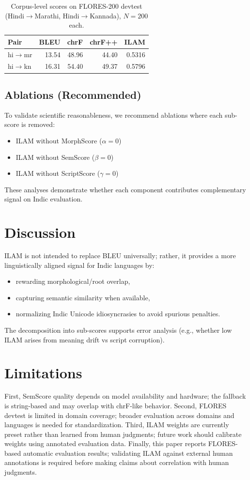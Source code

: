 \documentclass[conference]{IEEEtran}
\begin{document}
\begin{table}[t]
\centering
\caption{Corpus-level scores on FLORES-200 devtest (Hindi$\rightarrow$Marathi, Hindi$\rightarrow$Kannada), $N=200$ each.}
\label{tab:baselines}
\begin{tabular}{lrrrr}
\toprule
Pair & BLEU & chrF & chrF++ & ILAM \\
\midrule
hi$\rightarrow$mr & 13.54 & 48.96 & 44.40 & 0.5316 \\
hi$\rightarrow$kn & 16.31 & 54.40 & 49.37 & 0.5796 \\
\bottomrule
\end{tabular}
\end{table}

\subsection{Ablations (Recommended)}
To validate scientific reasonableness, we recommend ablations where each sub-score is removed:
\begin{itemize}
  \item ILAM without MorphScore ($\alpha=0$)
  \item ILAM without SemScore ($\beta=0$)
  \item ILAM without ScriptScore ($\gamma=0$)
\end{itemize}
These analyses demonstrate whether each component contributes complementary signal on Indic evaluation.

\section{Discussion}
ILAM is not intended to replace BLEU universally; rather, it provides a more linguistically aligned signal for Indic languages by:
\begin{itemize}
  \item rewarding morphological/root overlap,
  \item capturing semantic similarity when available,
  \item normalizing Indic Unicode idiosyncrasies to avoid spurious penalties.
\end{itemize}
The decomposition into sub-scores supports error analysis (e.g., whether low ILAM arises from meaning drift vs script corruption).

\section{Limitations}
First, SemScore quality depends on model availability and hardware; the fallback is string-based and may overlap with chrF-like behavior. Second, FLORES devtest is limited in domain coverage; broader evaluation across domains and languages is needed for standardization. Third, ILAM weights are currently preset rather than learned from human judgments; future work should calibrate weights using annotated evaluation data. Finally, this paper reports FLORES-based automatic evaluation results; validating ILAM against external human annotations is required before making claims about correlation with human judgments.
\end{document}

